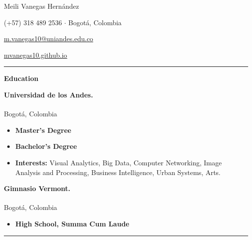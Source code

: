 \documentclass[10pt]{article}
\begin{document}
\begin{center}
\LARGE{Meili Vanegas Hernández} 

\normalsize{
 (+57) 318 489 2536 $\cdot$ Bogotá, Colombia
 
 \href{mailto:m.vanegas10@uniandes.edu.co}{\underline{m.vanegas10@uniandes.edu.co}}
 
\textcolor{blue}{\href{https://mvanegas10.github.io}{\underline{mvanegas10.github.io}}}

}
\end{center}
\hrule
\vspace{0.25cm}

\setcounter{secnumdepth}{0}
\setlength\parindent{0pt} 


{\large \textbf{Education}}
{\footnotesize
\begin{multicols}{3}
{\bf Universidad de los Andes.} \\  \\ Bogotá, Colombia
\end{multicols}
 
\begin{itemize}
	 \item {\bf Master's Degree}     
	 
	 \item {\bf Bachelor's Degree}     	
		
	\item \textbf{Interests:} Visual Analytics, Big Data, Computer Networking, Image Analysis and Processing, Business Intelligence, Urban Systems, Arts.
\end{itemize}}

\begin{multicols}{4}
{\bf Gimnasio Vermont.} \\  \\ Bogotá, Colombia
\end{multicols}
 
\begin{itemize}
	 \item {\bf High School, Summa Cum Laude}  
\end{itemize}


\vspace{0.25cm}
\hrule
\vspace{0.25cm}
\end{document}

